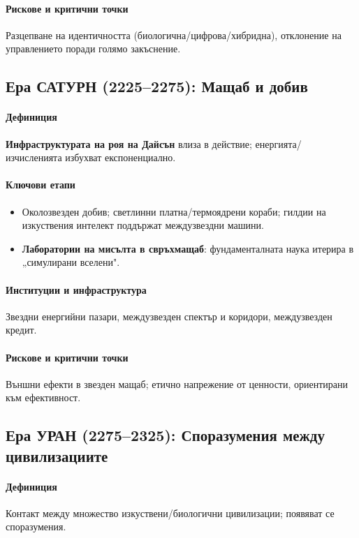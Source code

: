 \documentclass[11pt]{article}
\begin{document}
\paragraph{Рискове и критични точки} Разцепване на идентичността (биологична/цифрова/хибридна), отклонение на управлението поради голямо закъснение.

\subsection{Ера САТУРН (2225–2275): Мащаб и добив}
\paragraph{Дефиниция} \textbf{Инфраструктурата на роя на Дайсън} влиза в действие; енергията/изчисленията избухват експоненциално.

\paragraph{Ключови етапи}
\begin{itemize}[noitemsep]
  \item Околозвезден добив; светлинни платна/термоядрени кораби; гилдии на изкуствения интелект поддържат междузвездни машини.
  \item \textbf{Лаборатории на мисълта в свръхмащаб}: фундаменталната наука итерира в „симулирани вселени".
\end{itemize}

\paragraph{Институции и инфраструктура} Звездни енергийни пазари, междузвезден спектър и коридори, междузвезден кредит.

\paragraph{Рискове и критични точки} Външни ефекти в звезден мащаб; етично напрежение от ценности, ориентирани към ефективност.

\subsection{Ера УРАН (2275–2325): Споразумения между цивилизациите}
\paragraph{Дефиниция} Контакт между множество изкуствени/биологични цивилизации; появяват се споразумения.
\end{document}
